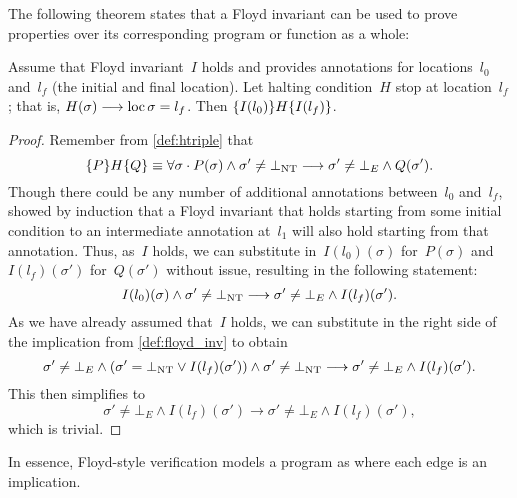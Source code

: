 The following theorem states that a Floyd invariant
can be used to prove properties over its corresponding program or function
as a whole:
\begin{theorem}\label{thm:floyd_hoare}
  Assume that Floyd invariant~$I$ holds and provides annotations for locations~$l_0$ and~$l_f$ (the initial and final location).
  Let halting condition~$H$ stop at location~$l_f$;%
  that is, $H(\sigma)\longrightarrow\operatorname{loc}\sigma=l_f$.
  Then $\{I(l_0)\}H\{I(l_f)\}$.
\end{theorem}
\begin{proof}
  Remember from \cref{def:htriple} that
  \begin{equation*}
    \{P\}H\{Q\}\equiv\forall\sigma\cdot
    P(\sigma)\wedge\sigma'\neq\bot_\mathrm{NT}\longrightarrow
    \sigma'\neq\bot_E\wedge Q(\sigma').
  \end{equation*}
  Though there could be any number of additional annotations between~$l_0$
  and~$l_f$, \textcite{floyd1967assigning} showed by induction
  that a Floyd invariant that holds starting from some initial condition
  to an intermediate annotation at~$l_1$ will also hold starting from that annotation.
  Thus, as~$I$ holds, we can substitute in~$I(l_0)(\sigma)$ for~$P(\sigma)$
  and~$I(l_f)(\sigma')$ for~$Q(\sigma')$ without issue,
  resulting in the following statement:
  \begin{equation*}
      I(l_0)(\sigma)\wedge\sigma'\neq\bot_\mathrm{NT}\longrightarrow
      \sigma'\neq\bot_E\wedge I(l_f)(\sigma').
  \end{equation*}
  As we have already assumed that~$I$ holds,
  we can substitute in the right side of the implication from \cref{def:floyd_inv}
  to obtain
  \begin{equation*}
    \sigma'\neq\bot_E\wedge(\sigma'=\bot_\mathrm{NT}\vee I(l_f)(\sigma'))\wedge
    \sigma'\neq\bot_\mathrm{NT}\longrightarrow
    \sigma'\neq\bot_E\wedge I(l_f)(\sigma').
  \end{equation*}
  This then simplifies to
  \begin{equation*}
    \sigma'\neq\bot_E\wedge I(l_f)(\sigma')\longrightarrow
    \sigma'\neq\bot_E\wedge I(l_f)(\sigma'),
  \end{equation*}
  which is trivial.
\end{proof}
In essence, Floyd-style verification%
models a program as  where each edge is an implication.

